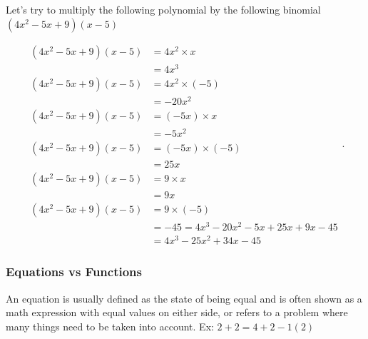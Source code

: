 \begin{example}
  \label{exm:multiplying_by_a_trinomial}

  Let's try to multiply the following polynomial by the following binomial
  $(4x^{2} - 5x + 9)(x - 5)$
  
  \begin{equation}
    \label{eqt:multiplying_by_a_trinomial}
    \begin{split}
      (4x^{2} - 5x + 9)(x - 5) &= 4x^{2} \times x \\
                            &= 4x^{3} \\
      (4x^{2} - 5x + 9)(x - 5) &= 4x^{2} \times (-5) \\
                            &= -20x^{2} \\
      (4x^{2} - 5x + 9)(x - 5) &= (-5x) \times x \\
                            &= -5x^{2} \\
      (4x^{2} - 5x + 9)(x - 5) &= (-5x) \times (-5) \\
                            &= 25x \\
      (4x^{2} - 5x + 9)(x - 5) &= 9 \times x \\
                            &= 9x \\
      (4x^{2} - 5x + 9)(x - 5) &= 9 \times (-5) \\
                            &= -45 = 4x^{3} - 20x^{2} - 5x + 25x + 9x - 45 \\
                            &= \boxed{4x^{3} - 25x^{2} + 34x - 45}
    \end{split}
  .\end{equation}
\end{example}



\subsubsection{Equations vs Functions}
\label{sub_sub_sec:equations_vs_functions}

\begin{definition}[Equation]
  \label{def:equation}

  An equation is usually defined as the state of being equal and is often shown
  as a math expression with equal values on either side, or refers to a problem
  where many things need to be taken into account. Ex: $2 + 2 = 4 + 2 - 1(2)$
\end{definition}

